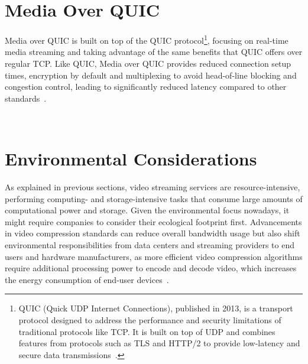 \section{Media Over QUIC}

Media over QUIC is built on top of the QUIC protocol\footnote{QUIC (Quick UDP Internet Connections), published in 2013, is a transport protocol designed to address the performance and security limitations of traditional protocols like TCP. It is built on top of UDP and combines features from protocols such as TLS and HTTP/2 to provide low-latency and secure data transmissions~\parencite{quic}.}, focusing on real-time media streaming and taking advantage of the same benefits that QUIC offers over regular TCP. Like QUIC, Media over QUIC provides reduced connection setup times, encryption by default and multiplexing to avoid head-of-line blocking and congestion control, leading to significantly reduced latency compared to other standards~\parencite{moq_ieft}.

~\parencite{moq_project}

\section{Environmental Considerations}

As explained in previous sections, video streaming services are resource-intensive, performing computing- and storage-intensive tasks that consume large amounts of computational power and storage.
Given the environmental focus nowadays, it might require companies to consider their ecological footprint first. Advancements in video compression standards can reduce overall bandwidth usage but also shift environmental responsibilities from data centers and streaming providers to end users and hardware manufacturers, as more efficient video compression algorithms require additional processing power to encode and decode video, which increases the energy consumption of end-user devices~\parencite{save_environment}.